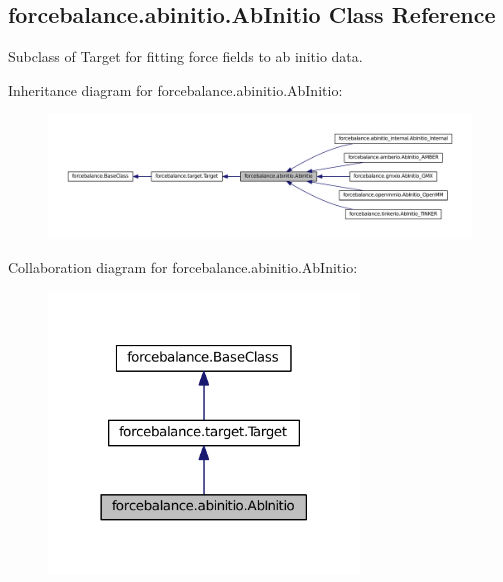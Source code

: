 \hypertarget{classforcebalance_1_1abinitio_1_1AbInitio}{\subsection{forcebalance.\-abinitio.\-Ab\-Initio \-Class \-Reference}
\label{classforcebalance_1_1abinitio_1_1AbInitio}
}


\-Subclass of \-Target for fitting force fields to ab initio data.  




\-Inheritance diagram for forcebalance.\-abinitio.\-Ab\-Initio\-:
\nopagebreak
\begin{figure}[H]
\begin{center}
\leavevmode
\includegraphics[width=350pt]{classforcebalance_1_1abinitio_1_1AbInitio__inherit__graph}
\end{center}
\end{figure}


\-Collaboration diagram for forcebalance.\-abinitio.\-Ab\-Initio\-:
\nopagebreak
\begin{figure}[H]
\begin{center}
\leavevmode
\includegraphics[width=234pt]{classforcebalance_1_1abinitio_1_1AbInitio__coll__graph}
\end{center}
\end{figure}
